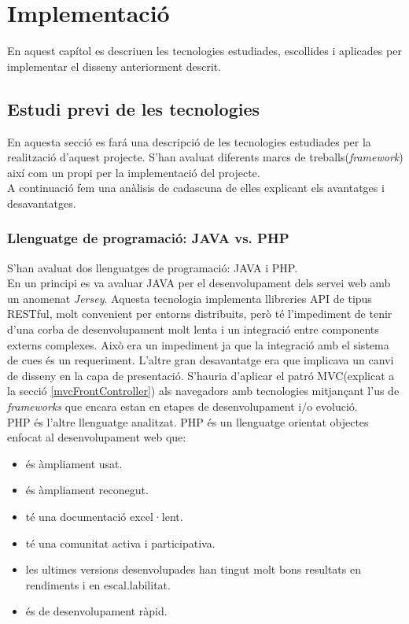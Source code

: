 \chapter{Implementaci\'{o}}
\label{cha:implementation}
En aquest capítol es descriuen les tecnologies estudiades, escollides i aplicades per implementar el disseny anteriorment descrit.

\section{Estudi previ de les tecnologies}
En aquesta secci\'{o} es far\'{a} una descripci\'{o} de les tecnologies estudiades per la realització d'aquest projecte. S'han avaluat diferents marcs de treballs(\textit{framework}) així com un propi per la implementació del projecte.\\

A continuació fem una anàlisis de cadascuna de elles explicant els avantatges i desavantatges.

\subsection{Llenguatge de programació: JAVA vs. PHP}
S'han avaluat dos llenguatges de programació: JAVA i PHP.\\

En un principi es va avaluar JAVA per el desenvolupament dels servei web amb un  anomenat \textit{Jersey}.\cite{jersey} Aquesta tecnologia implementa llibreries API de tipus RESTful, molt convenient per entorns distribuits, però t\'{e} l'impediment de tenir d'una corba de desenvolupament molt lenta i un integració entre components externs complexes. Això era un impediment ja que la integració amb el sistema de cues \'{e}s un requeriment. L'altre gran desavantatge era que implicava un canvi de disseny en la capa de presentació. S'hauria d'aplicar el patró MVC(explicat a la secció \ref{mvcFrontController}) als navegadors amb tecnologies mitjançant l'us de \textit{frameworks} que encara estan en etapes de desenvolupament i/o evolució.\\

PHP \'{e}s l'altre llenguatge analitzat. PHP \'{e}s un llenguatge orientat objectes enfocat al desenvolupament web que:
\begin{itemize}
\item \'{e}s àmpliament usat.
\item \'{e}s àmpliament reconegut.
\item t\'{e} una documentació excel·lent.
\item t\'{e} una comunitat activa i participativa.
\item les ultimes versions desenvolupades han tingut molt bons resultats en rendiments i en escal.labilitat.
\item \'{e}s de desenvolupament ràpid.
\end{itemize}

